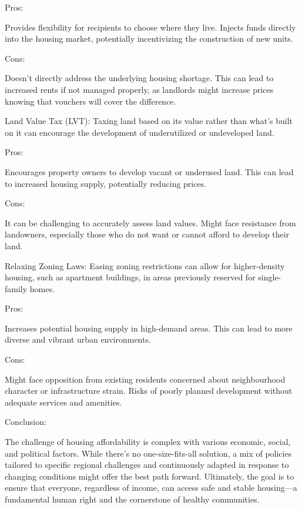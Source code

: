 Pros:

Provides flexibility for recipients to choose where they live.
Injects funds directly into the housing market, potentially incentivizing the construction of new units.

Cons:

Doesn't directly address the underlying housing shortage.
This can lead to increased rents if not managed properly, as landlords might increase prices knowing that vouchers will cover the difference.

Land Value Tax (LVT): Taxing land based on its value rather than what's built on it can encourage the development of underutilized or undeveloped land.

Pros:

Encourages property owners to develop vacant or underused land.
This can lead to increased housing supply, potentially reducing prices.

Cons:

It can be challenging to accurately assess land values.
Might face resistance from landowners, especially those who do not want or cannot afford to develop their land.

Relaxing Zoning Laws: Easing zoning restrictions can allow for higher-density housing, such as apartment buildings, in areas previously reserved for single-family homes.

Pros:

Increases potential housing supply in high-demand areas.
This can lead to more diverse and vibrant urban environments.

Cons:

Might face opposition from existing residents concerned about neighbourhood character or infrastructure strain.
Risks of poorly planned development without adequate services and amenities.

Conclusion:

The challenge of housing affordability is complex with various economic, social, and political factors. While there's no one-size-fits-all solution, a mix of policies tailored to specific regional challenges and continuously adapted in response to changing conditions might offer the best path forward. Ultimately, the goal is to ensure that everyone, regardless of income, can access safe and stable housing—a fundamental human right and the cornerstone of healthy communities.
